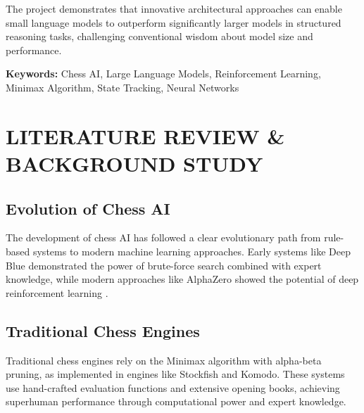 \documentclass[11pt,a4paper]{report}
\begin{document}
The project demonstrates that innovative architectural approaches can enable small language models to outperform significantly larger models in structured reasoning tasks, challenging conventional wisdom about model size and performance.

\textbf{Keywords:} Chess AI, Large Language Models, Reinforcement Learning, Minimax Algorithm, State Tracking, Neural Networks



\chapter{LITERATURE REVIEW \& BACKGROUND STUDY}
\thispagestyle{fancy}

\section{Evolution of Chess AI}
The development of chess AI has followed a clear evolutionary path from rule-based systems to modern machine learning approaches. Early systems like Deep Blue demonstrated the power of brute-force search combined with expert knowledge, while modern approaches like AlphaZero showed the potential of deep reinforcement learning \cite{alphazero}.

\section{Traditional Chess Engines}
Traditional chess engines rely on the Minimax algorithm with alpha-beta pruning, as implemented in engines like Stockfish \cite{stockfish, chess_engine_evaluation} and Komodo. These systems use hand-crafted evaluation functions and extensive opening books, achieving superhuman performance through computational power and expert knowledge.
\end{document}
